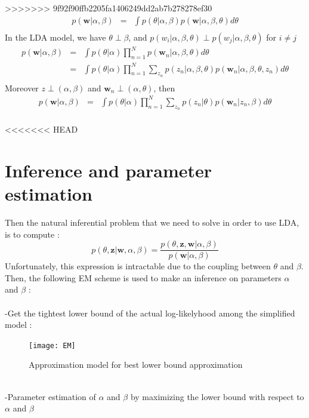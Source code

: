 \documentclass[12pt]{article}
\begin{document}
>>>>>>> 9f92f90ffb2205fa1406249dd2ab7b278278ef30
\begin{eqnarray*}
p(\textbf{w}|\alpha, \beta) &  = & \int p(\theta | \alpha, \beta)p(\textbf{w} | \alpha, \beta, \theta)d\theta\\
\end{eqnarray*}
In the LDA model, we have $ \theta \perp \beta$, and $p(w_{i} | \alpha, \beta, \theta) \perp p(w_{j} | \alpha, \beta, \theta)$  for $ i \neq j $
\begin{eqnarray*}
p(\textbf{w}|\alpha, \beta) & = & \int p(\theta | \alpha) \prod_{n=1}^{N} p(\textbf{w}_{n} | \alpha, \beta, \theta)d\theta\\
& = & \int  p(\theta |\alpha) \prod_{n=1}^{N}  \sum_{z_{n}}p(z_{n}|\alpha, \beta, \theta)p(\textbf{w}_{n} | \alpha, \beta, \theta, z_{n}) d\theta\\
\end{eqnarray*}
Moreover $z \perp (\alpha,\beta)$ and $\textbf{w}_{n} \perp (\alpha,\theta)$, then
\begin{eqnarray*}
p(\textbf{w}|\alpha, \beta) & = & \int p(\theta | \alpha)  \prod_{n=1}^{N}  \sum_{z_{n}}p(z_{n} |\theta)p(\textbf{w}_{n} | z_{n}, \beta) d\theta\\
\end{eqnarray*}

<<<<<<< HEAD
\section*{Inference and parameter estimation}
Then the natural inferential problem that we need to solve in order to use LDA, is to compute :
$$p(\theta, \textbf{z}|\textbf{w},\alpha,\beta)=\frac{p(\theta,\textbf{z},\textbf{w}|\alpha,\beta)}{p(\textbf{w}|\alpha,\beta)}$$
Unfortunately, this expression is intractable due to the coupling between $\theta$ and $\beta$.
Then, the following EM scheme is used to make an inference on parameters $\alpha$ and $\beta$ : ~\\
~\\
-Get the tightest lower bound of the actual log-likelyhood among the simplified model :~\\
\begin{figure}[!h]
\centering
\captionsetup{justification=centering,margin=2cm}
\texttt{[image: EM]}
\caption{Approximation model for best lower bound approximation}
\end{figure}
~\\
-Parameter estimation of $\alpha$ and $\beta$ by maximizing the lower bound with respect to $\alpha$ and $\beta$~\\
\end{document}
